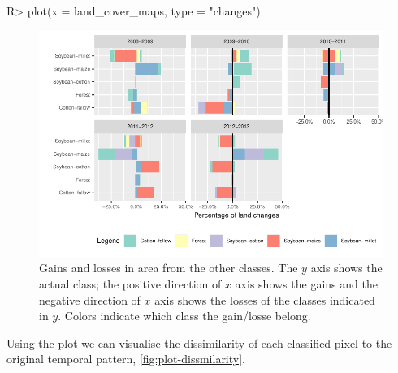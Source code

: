 \documentclass[article,shortnames]{jss}
\begin{document}
\begin{CodeChunk}

\begin{CodeInput}
R> plot(x = land_cover_maps, type = "changes")
\end{CodeInput}
\begin{figure}[!h]

{\centering \includegraphics{dtwSat_files/figure-latex/plot-change-1} 

}

\caption[Gains and losses in area from the other classes]{Gains and losses in area from the other classes. The $y$ axis shows the actual class; the positive direction of $x$ axis shows the gains and the negative direction of $x$ axis shows the losses of the classes indicated in $y$. Colors indicate which class the gain/losse belong.}\label{fig:plot-change}
\end{figure}
\end{CodeChunk}

Using the plot  we can visualise the
dissimilarity of each classified pixel to the original temporal pattern,
\autoref{fig:plot-dissmilarity}.
\end{document}
